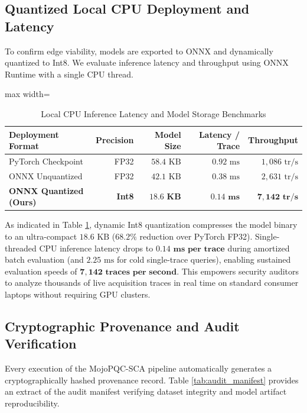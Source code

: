 \documentclass[letterpaper]{article}
\begin{document}
\subsection{Quantized Local CPU Deployment and Latency}
To confirm edge viability, models are exported to ONNX and dynamically quantized to Int8. We evaluate inference latency and throughput using ONNX Runtime with a single CPU thread.

\begin{table}[htbp]
\centering
\caption{Local CPU Inference Latency and Model Storage Benchmarks}
\label{tab:inference_benchmarks}
\begin{adjustbox}{max width=\linewidth}
\begin{tabular}{|l|r|r|r|r|}
\hline
\textbf{Deployment Format} & \textbf{Precision} & \textbf{Model Size} & \textbf{Latency / Trace} & \textbf{Throughput} \\ 
\hline
PyTorch Checkpoint & FP32 & $58.4\text{ KB}$ & $0.92\text{ ms}$ & $1,086\text{ tr/s}$ \\
ONNX Unquantized & FP32 & $42.1\text{ KB}$ & $0.38\text{ ms}$ & $2,631\text{ tr/s}$ \\
\textbf{ONNX Quantized (Ours)} & \textbf{Int8} & $\mathbf{18.6\text{ KB}}$ & $\mathbf{0.14\text{ ms}}$ & $\mathbf{7,142\text{ tr/s}}$ \\
\hline
\end{tabular}
\end{adjustbox}
\end{table}

As indicated in Table \ref{tab:inference_benchmarks}, dynamic Int8 quantization compresses the model binary to an ultra-compact $18.6\text{ KB}$ ($68.2\%$ reduction over PyTorch FP32). Single-threaded CPU inference latency drops to $\mathbf{0.14\text{ ms per trace}}$ during amortized batch evaluation (and $2.25\text{ ms}$ for cold single-trace queries), enabling sustained evaluation speeds of $\mathbf{7,142\text{ traces per second}}$. This empowers security auditors to analyze thousands of live acquisition traces in real time on standard consumer laptops without requiring GPU clusters.

\subsection{Cryptographic Provenance and Audit Verification}
Every execution of the MojoPQC-SCA pipeline automatically generates a cryptographically hashed provenance record. Table \ref{tab:audit_manifest} provides an extract of the audit manifest verifying dataset integrity and model artifact reproducibility.
\end{document}
